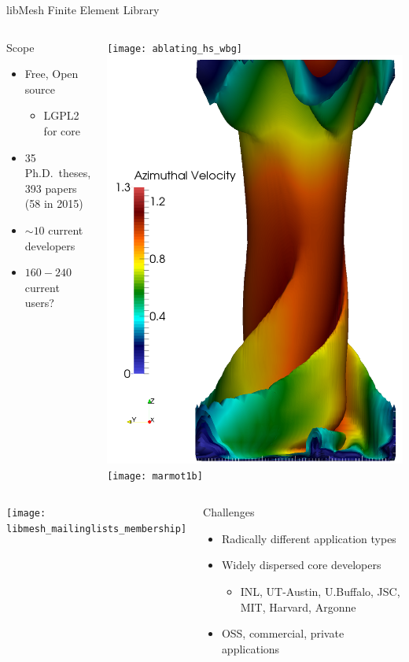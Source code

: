 \documentclass[mathserif]{beamer}
\begin{document}
\begin{frame}{libMesh Finite Element Library}
\begin{columns}
\begin{block}{Scope}
\begin{itemize}
\item Free, Open source
\begin{itemize}
\item LGPL2 for core
\end{itemize}
\item 35 Ph.D.\ theses, 393 papers (58 in 2015)
\item $\sim10$ current developers
\item $160-240$ current users?
\end{itemize}
\end{block}

\texttt{[image: ablating\_hs\_wbg]}
\includegraphics[width=.25\textwidth]{sov}
\texttt{[image: marmot1b]}
\end{columns}

\begin{columns}
\texttt{[image: libmesh\_mailinglists\_membership]}

\begin{block}{Challenges}
\begin{itemize}
\item Radically different application types
\item Widely dispersed core developers
\begin{itemize}
\item INL, UT-Austin, U.Buffalo, JSC, MIT, Harvard, Argonne
\end{itemize}
\item OSS, commercial, private applications
\end{itemize}
\end{block}
\end{columns}

\end{frame}
\end{document}
